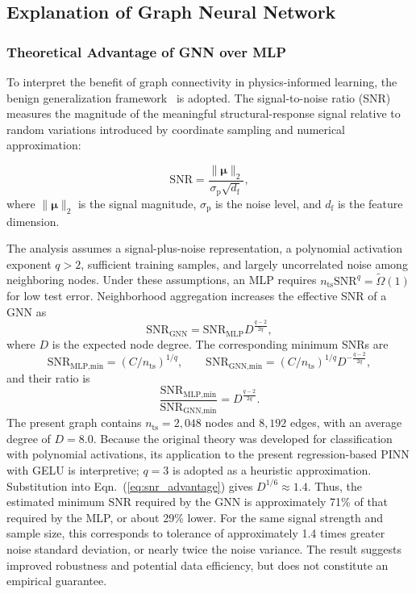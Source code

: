 \documentclass[review, authoryear, 12pt]{elsarticle}
\begin{document}
\subsection{Explanation of Graph Neural Network}

\subsubsection{Theoretical Advantage of GNN over MLP}

To interpret the benefit of graph connectivity in physics-informed learning, the benign generalization framework~\citep{cao_benign_2022, huang_quantifying_2025} is adopted. The signal-to-noise ratio (SNR) measures the magnitude of the meaningful structural-response signal relative to random variations introduced by coordinate sampling and numerical approximation:

\begin{equation}
    \mathrm{SNR} =
    \frac{\|\boldsymbol{\mu}\|_2}
    {\sigma_{\text{p}}\sqrt{d_{\text{f}}}},
\end{equation}
where $\|\boldsymbol{\mu}\|_2$ is the signal magnitude, $\sigma_{\text{p}}$ is the noise level, and $d_{\text{f}}$ is the feature dimension.

The analysis assumes a signal-plus-noise representation, a polynomial activation exponent $q>2$, sufficient training samples, and largely uncorrelated noise among neighboring nodes. Under these assumptions, an MLP requires $n_{\text{ts}}\mathrm{SNR}^{q}=\tilde{\Omega}(1)$ for low test error. Neighborhood aggregation increases the effective SNR of a GNN as
\begin{equation}
    \mathrm{SNR}_{\text{GNN}}
    =
    \mathrm{SNR}_{\text{MLP}}
    D^{\frac{q-2}{2q}},
\end{equation}
where $D$ is the expected node degree. The corresponding minimum SNRs are
\begin{equation}
    \mathrm{SNR}_{\text{MLP,min}}
    =
    (C/n_{\text{ts}})^{1/q},
    \qquad
    \mathrm{SNR}_{\text{GNN,min}}
    =
    (C/n_{\text{ts}})^{1/q}
    D^{-\frac{q-2}{2q}},
\end{equation}
and their ratio is
\begin{equation}
    \frac{\mathrm{SNR}_{\text{MLP,min}}}
    {\mathrm{SNR}_{\text{GNN,min}}}
    =
    D^{\frac{q-2}{2q}}.
    \label{eq:snr_advantage}
\end{equation}
The present graph contains $n_{\text{ts}}=2{,}048$ nodes and $8{,}192$ edges, with an average degree of $D=8.0$. Because the original theory was developed for classification with polynomial activations, its application to the present regression-based PINN with GELU is interpretive; $q=3$ is adopted as a heuristic approximation. Substitution into Eqn.~(\ref{eq:snr_advantage}) gives $D^{1/6}\approx1.4$. Thus, the estimated minimum SNR required by the GNN is approximately 71\% of that required by the MLP, or about 29\% lower. For the same signal strength and sample size, this corresponds to tolerance of approximately 1.4 times greater noise standard deviation, or nearly twice the noise variance. The result suggests improved robustness and potential data efficiency, but does not constitute an empirical guarantee.
\end{document}
